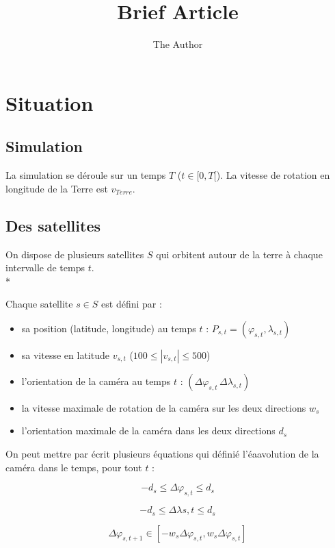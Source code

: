 \documentclass[11pt, oneside]{article}   	%
\title{Brief Article}
\author{The Author}
\begin{document}
\section{Situation}

\subsection{Simulation}

La simulation se déroule sur un temps $T$ ($t \in [0, T[$).
La vitesse de rotation en longitude de la Terre est $v_{\mathit{Terre}}$.

\subsection{Des satellites}

On dispose de plusieurs satellites $S$ qui orbitent autour de la terre à
chaque intervalle de temps $t$. \\*

Chaque satellite $s \in S$ est défini par :

\begin{itemize}
\item sa position (latitude, longitude) au temps $t$ : $P_{s, t} = (\varphi_{s, t}, \lambda_{s, t})$
\item sa vitesse en latitude $v_{s, t}$ ($100 \leq |v_{s,t}| \leq 500$)
\item l'orientation de la caméra au temps $t$ : $(\Delta\varphi_{s, t}\, \Delta\lambda_{s, t})$
\item la vitesse maximale de rotation de la caméra sur les deux directions $w_s$
\item l'orientation maximale de la caméra dans les deux directions $d_s$
\end{itemize}

On peut mettre par écrit plusieurs équations qui définié
l'\'eaavolution de la caméra dans le temps, pour tout $t$ :

\begin{equation}
-d_s \leq \Delta\varphi_{s, t} \leq d_s
\label{max-phi}
\end{equation}

\begin{equation}
-d_s \leq \Delta\lambda{s, t} \leq d_s
\label{max-lambda}
\end{equation}

\begin{equation}
\Delta\varphi_{s, t+1} \in [-w_s\Delta\varphi_{s, t}, w_s\Delta\varphi_{s, t}]
\label{max-speed-phi}
\end{equation}
\end{document}

